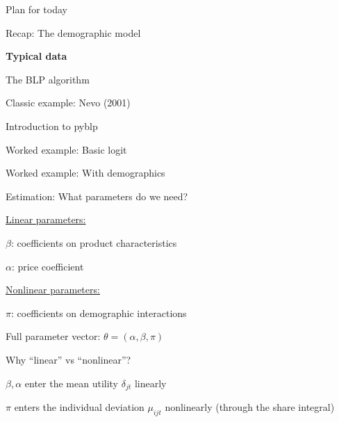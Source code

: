 \documentclass[notes,11pt, aspectratio=169]{beamer}
\newenvironment{wideitemize}{\itemize\addtolength{\itemsep}{10pt}}{\enditemize}
\newenvironment{wideenumerate}{\enumerate\addtolength{\itemsep}{10pt}}{\endenumerate}
\begin{document}
\begin{frame}{Plan for today}
  \begin{wideenumerate}
    \item Recap: The demographic model
    \item \textbf{Typical data}
    \item The BLP algorithm
    \item Classic example: Nevo (2001)
    \item Introduction to pyblp
    \item Worked example: Basic logit
    \item Worked example: With demographics
  \end{wideenumerate}
\end{frame}

\begin{frame}{Estimation: What parameters do we need?}
	\begin{wideitemize}
		\item \underline{Linear parameters:}
		\begin{wideitemize}
			\item $\beta$: coefficients on product characteristics
			\item $\alpha$: price coefficient
		\end{wideitemize}
		\item \underline{Nonlinear parameters:}
		\begin{wideitemize}
			\item $\pi$: coefficients on demographic interactions
		\end{wideitemize}
		\item Full parameter vector: $\theta = (\alpha, \beta, \pi)$
		\item Why ``linear'' vs ``nonlinear''?
		\begin{wideitemize}
			\vspace{3pt}
			\item $\beta, \alpha$ enter the mean utility $\delta_{jt}$ linearly
			\item $\pi$ enters the individual deviation $\mu_{ijt}$ nonlinearly (through the share integral)
		\end{wideitemize}
	\end{wideitemize}
\end{frame}
\end{document}
